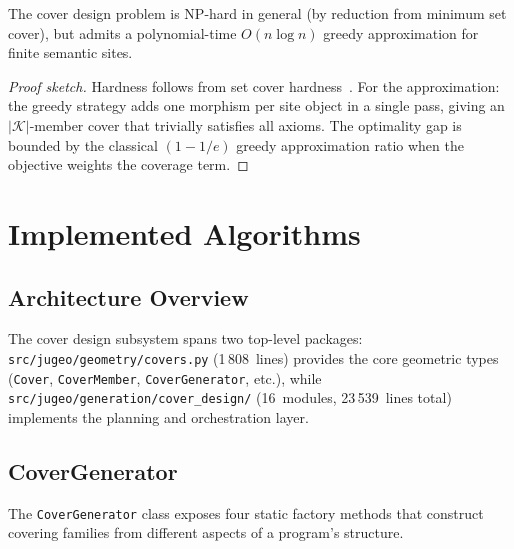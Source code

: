 \documentclass[11pt]{article}
\begin{document}
\begin{proposition}
The cover design problem is NP-hard in general (by reduction from
minimum set cover), but admits a polynomial-time $O(n \log n)$ greedy
approximation for finite semantic sites.
\end{proposition}

\begin{proof}[Proof sketch]
Hardness follows from set cover hardness~\cite{karp1972}.
For the approximation: the greedy strategy adds one morphism per site
object in a single pass, giving an $|\mathcal{K}|$-member cover that
trivially satisfies all axioms.  The optimality gap is bounded by the
classical $(1 - 1/e)$ greedy approximation ratio when the objective
weights the coverage term.
\end{proof}

\section{Implemented Algorithms}\label{sec:algorithms}

\subsection{Architecture Overview}

The cover design subsystem spans two top-level packages:
\texttt{src/jugeo/geometry/covers.py} (1\,808~lines) provides the
core geometric types (\texttt{Cover}, \texttt{CoverMember},
\texttt{CoverGenerator}, etc.), while
\texttt{src/jugeo/generation/cover\_design/} (16~modules,
23\,539~lines total) implements the planning and orchestration layer.

\subsection{CoverGenerator}

The \texttt{CoverGenerator} class exposes four static factory methods
that construct covering families from different aspects of a
\Python{} program's structure.
\end{document}

